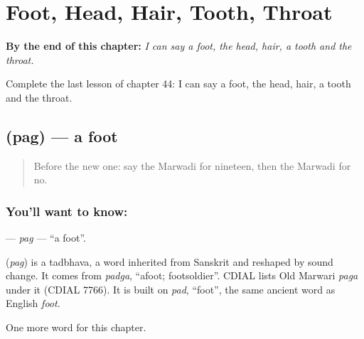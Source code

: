 
\chapter{Foot, Head, Hair, Tooth, Throat}
\label{ch:mw-foot-head-hair-tooth-throat}

\begin{chapteropening}
\textbf{By the end of this chapter:} \emph{I can say a foot, the head, hair, a tooth and the throat.}

Complete the last lesson of chapter 44: I can say a foot, the head, hair, a tooth and the throat.
\end{chapteropening}

\section[\texorpdfstring{\mw{पग} (pag)}{पग (pag)}]{ (pag) — a foot}

\label{lesson:MW-C44-pag}



\begin{quote}
Before the new one: say the Marwadi for nineteen, then the Marwadi for no.
\end{quote}

\subsection*{You'll want to know: }
\textbf{} — \emph{pag} — \textquotedblleft{}a foot\textquotedblright{}.

\begin{cousinweb}
\textbf{} (\emph{pag}) is a tadbhava, a word inherited from Sanskrit and reshaped by sound change. It comes from \emph{padga}, \textquotedblleft{}afoot; footsoldier\textquotedblright{}. CDIAL lists Old Marwari \emph{paga} under it (CDIAL 7766). It is built on \emph{pad}, \textquotedblleft{}foot\textquotedblright{}, the same ancient word as English \emph{foot}.
\end{cousinweb}

\begin{grammarlens}[title={What you've built}]
One more word for this chapter.
\end{grammarlens}


